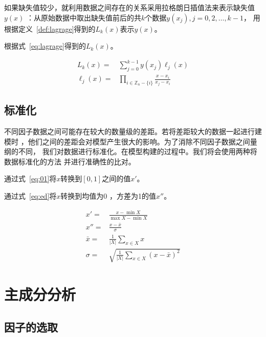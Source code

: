 \documentclass[../main]{subfiles}
\begin{document}
如果缺失值较少，就利用数据之间存在的关系采用拉格朗日插值法来表示缺失值$y(x)$
：从原始数据中取出缺失值前后的共$k$个数据$y(x_j), j = 0, 2, \ldots, k - 1$，
用根据定义~\ref{def:lagrage}得到的$L_k(x)$表示$y(x)$。

\begin{definition}[拉格朗日插值法]%
  \label{def:lagrage}
  根据式~\ref{eq:lagrage}得到的$L_k(x)$。
\end{definition}

\begin{align}
  \label{eq:lagrage}
  L_k(x) = & \sum_{j = 0}^{k - 1} y(x_j) \ell_j(x)\\
  \ell_j(x) = & \prod_{i\in \mathbb{Z}_n - \{i\}}\frac{x-x_i}{x_j-x_i}
\end{align}

\subsection{标准化}%
\label{sub:standard}

不同因子数据之间可能存在较大的数量级的差距。若将差距较大的数据一起进行建模时
，他们之间的差距会对模型产生很大的影响。为了消除不同因子数据之间量纲的不同，
我们对数据进行标准化。在模型构建的过程中。我们将会使用两种将数据标准化的方法
并进行准确性的比对。

\begin{definition}[0--1标准化]
  通过式~\ref{eq:01}将$x$转换到$[0, 1]$之间的值$x'$。
\end{definition}

\begin{definition}[均值方差标准化]
  通过式~\ref{eq:ed}将$x$转换到均值为0 ，方差为1的值$x''$。
\end{definition}

\begin{align}
  \label{eq:01}
  x' = & \frac{x-\min{X}}{\max{X} - \min{X}}\\
  \label{eq:ed}
  x'' = & \frac{x - \bar{x}}{\sigma}\\
  \bar{x} = & \frac{1}{\lvert X\rvert}\sum_{x \in X} x\\
  \sigma = & \sqrt{\frac{1}{\lvert X\rvert}\sum_{x \in X}{(x - \bar{x})}^2}
\end{align}

\section{主成分分析}%
\label{sec:factor}

\subsection{因子的选取}%
\label{sub:factor_chosen}
\end{document}
